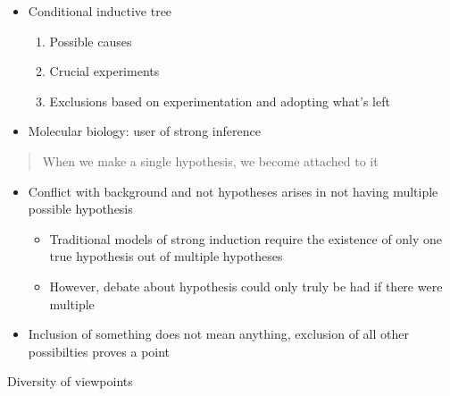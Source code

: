 \documentclass[letterpaper]{article}
\begin{document}
\begin{itemize}
\item Conditional inductive tree

\begin{enumerate}
\item Possible causes
\item Crucial experiments
\item Exclusions based on experimentation and adopting what's left
\end{enumerate}

\item Molecular biology: user of strong inference
\end{itemize}

\begin{quote}
When we make a single hypothesis, we become attached to it
\end{quote}

\begin{itemize}
\item Conflict with background and not hypotheses arises in not having
multiple possible hypothesis

\begin{itemize}
\item Traditional models of strong induction require the existence of only
one true hypothesis out of multiple hypotheses
\item However, debate about hypothesis could only truly be had if there
were multiple
\end{itemize}

\item Inclusion of something does not mean anything, exclusion of all other
possibilties proves a point
\end{itemize}

Diversity of viewpoints
\end{document}
